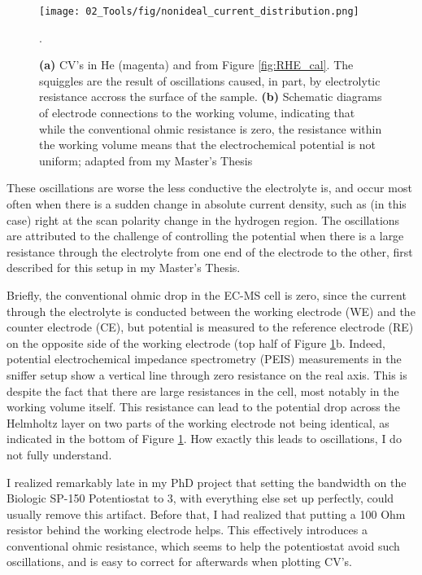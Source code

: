 \begin{figure}[h!]
	\texttt{[image: 02\_Tools/fig/nonideal\_current\_distribution.png]}
	\caption{\textbf{(a)} CV's in He (magenta) and  from Figure \ref{fig:RHE_cal}. The squiggles are the result of oscillations caused, in part, by electrolytic resistance accross the surface of the sample. \textbf{(b)} Schematic diagrams of electrode connections to the working volume, indicating that while the conventional ohmic resistance is zero, the resistance within the working volume means that the electrochemical potential is not uniform; adapted from my Master's Thesis\cite{Scott2016_MSc}}.
	\label{fig:current_distribution}
\end{figure}

These oscillations are worse the less conductive the electrolyte is, and occur most often when there is a sudden change in absolute current density, such as (in this case) right at the scan polarity change in the hydrogen region. The oscillations are attributed to the challenge of controlling the potential when there is a large resistance through the electrolyte from one end of the electrode to the other, first described for this setup in my Master's Thesis\cite{Scott2016_MSc}. 

Briefly, the conventional ohmic drop in the EC-MS cell is zero, since the current through the electrolyte is conducted between the working electrode (WE) and the counter electrode (CE), but potential is measured to the reference electrode (RE) on the opposite side of the working electrode (top half of Figure \ref{fig:current_distribution}b. Indeed, potential electrochemical impedance spectrometry (PEIS) measurements in the sniffer setup show a vertical line through zero resistance on the real axis. This is despite the fact that there are large resistances in the cell, most notably in the working volume itself. This resistance can lead to the potential drop across the Helmholtz layer on two parts of the working electrode not being identical, as indicated in the bottom of Figure \ref{fig:current_distribution}. How exactly this leads to oscillations, I do not fully understand.

I realized remarkably late in my PhD project that setting the bandwidth on the Biologic SP-150 Potentiostat to 3, with everything else set up perfectly, could usually remove this artifact. Before that, I had realized that putting a 100 Ohm resistor behind the working electrode helps. This effectively introduces a conventional ohmic resistance, which seems to help the potentiostat avoid such oscillations, and is easy to correct for afterwards when plotting CV's.

